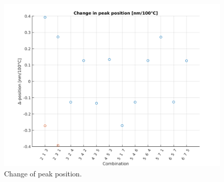 \documentclass[12pt,a4paper,twoside]{article}
\begin{document}
\begin{figure}[!h]
	\centering
	\includegraphics[width=.75\textwidth]{ppc2.png}
	\caption{Change of peak position.}
	\label{fig_sym_ppc2} %
\end{figure}
\end{document}
